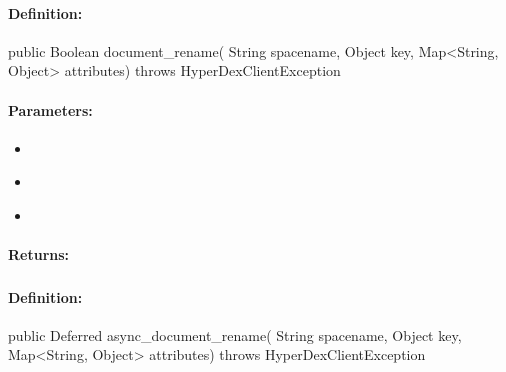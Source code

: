 \paragraph{Definition:}
\begin{javacode}
public Boolean document_rename(
        String spacename,
        Object key,
        Map<String, Object> attributes) throws HyperDexClientException
\end{javacode}

\paragraph{Parameters:}
\begin{itemize}[noitemsep]
\item {}\\

\item {}\\

\item {}\\

\end{itemize}

\paragraph{Returns:}


\pagebreak
\subsubsection{}
\label{api:java:async_document_rename}


\paragraph{Definition:}
\begin{javacode}
public Deferred async_document_rename(
        String spacename,
        Object key,
        Map<String, Object> attributes) throws HyperDexClientException
\end{javacode}

